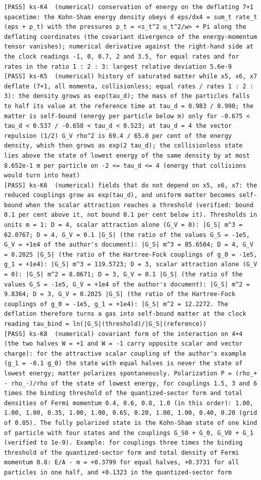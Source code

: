 \documentclass[
  10pt,
]{article}
\begin{document}
\begin{verbatim}
[PASS] ks-K4  (numerical) conservation of energy on the deflating 7+1 spacetime: the Kohn-Sham energy density obeys d eps/dx4 = sum_t rate_t (eps + p_t) with the pressures p_t = <s_t^2 u_t^2/w> + Pi along the deflating coordinates (the covariant divergence of the energy-momentum tensor vanishes); numerical derivative against the right-hand side at the clock readings -1, 0, 0.7, 2 and 3.5, for equal rates and for rates in the ratio 1 : 2 : 3: largest relative deviation 5.6e-9
[PASS] ks-K5  (numerical) history of saturated matter while x5, x6, x7 deflate (7+1, all momenta, collisionless; equal rates / rates 1 : 2 : 3): the density grows as exp(tau_d); the mass of the particles falls to half its value at the reference time at tau_d = 0.983 / 0.990; the matter is self-bound (energy per particle below m) only for -0.675 < tau_d < 0.537 / -0.658 < tau_d < 0.523; at tau_d = 4 the vector repulsion (1/2) G_V rho^2 is 69.4 / 65.0 per cent of the energy density, which then grows as exp(2 tau_d); the collisionless state lies above the state of lowest energy of the same density by at most 8.652e-1 m per particle on -2 <= tau_d <= 4 (energy that collisions would turn into heat)
[PASS] ks-K6  (numerical) fields that do not depend on x5, x6, x7: the reduced couplings grow as exp(tau_d), and uniform matter becomes self-bound when the scalar attraction reaches a threshold (verified: bound 0.1 per cent above it, not bound 0.1 per cent below it). Thresholds in units m = 1: D = 4, scalar attraction alone (G_V = 0): |G_S| m^3 = 62.0767; D = 4, G_V = 0.1 |G_S| (the ratio of the values G_S = -1e5, G_V = +1e4 of the author's document): |G_S| m^3 = 85.6504; D = 4, G_V = 0.2025 |G_S| (the ratio of the Hartree-Fock couplings of g_0 = -1e5, g_1 = +1e4): |G_S| m^3 = 119.5723; D = 3, scalar attraction alone (G_V = 0): |G_S| m^2 = 8.0671; D = 3, G_V = 0.1 |G_S| (the ratio of the values G_S = -1e5, G_V = +1e4 of the author's document): |G_S| m^2 = 9.8364; D = 3, G_V = 0.2025 |G_S| (the ratio of the Hartree-Fock couplings of g_0 = -1e5, g_1 = +1e4): |G_S| m^2 = 12.2272. The deflation therefore turns a gas into self-bound matter at the clock reading tau_bind = ln(|G_S|(threshold)/|G_S|(reference))
[PASS] ks-K8  (numerical) covariant form of the interaction on 4+4 (the two halves W = +1 and W = -1 carry opposite scalar and vector charge): for the attractive scalar coupling of the author's example (g_1 = -0.1 g_0) the state with equal halves is never the state of lowest energy; matter polarizes spontaneously. Polarization P = (rho_+ - rho_-)/rho of the state of lowest energy, for couplings 1.5, 3 and 6 times the binding threshold of the quantized-sector form and total densities of Fermi momentum 0.4, 0.6, 0.8, 1.0 (in this order): 1.00, 1.00, 1.00, 0.35, 1.00, 1.00, 0.65, 0.20, 1.00, 1.00, 0.40, 0.20 (grid of 0.05). The fully polarized state is the Kohn-Sham state of one kind of particle with four states and the couplings G_S0 + G_0, G_V0 + G_1 (verified to 1e-9). Example: for couplings three times the binding threshold of the quantized-sector form and total density of Fermi momentum 0.8: E/A - m = +0.3799 for equal halves, +0.3731 for all particles in one half, and +0.1323 in the quantized-sector form

\end{verbatim}
\end{document}
